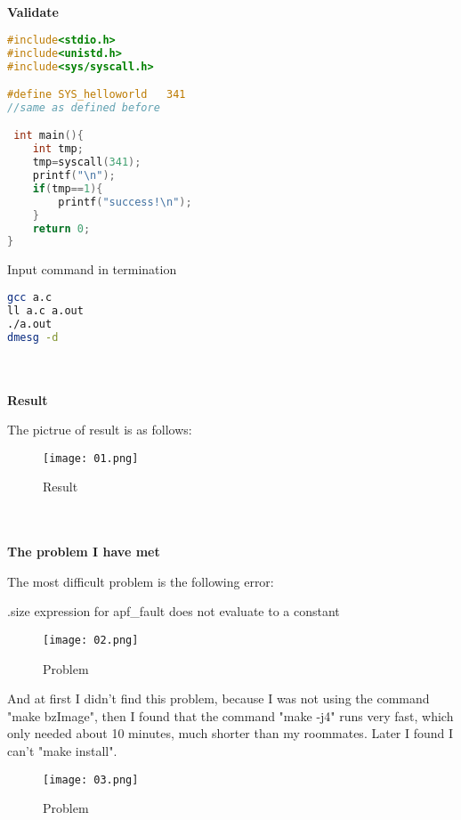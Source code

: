 \documentclass[12pt,a4paper]{article}
\begin{document}
\begin{large}
~\\
~\\
\textbf{Validate}
\end{large}

\begin{lstlisting}[language=C] 
#include<stdio.h>
#include<unistd.h>
#include<sys/syscall.h>

#define SYS_helloworld   341   
//same as defined before

 int main(){
	int tmp;
	tmp=syscall(341);
	printf("\n");
	if(tmp==1){
		printf("success!\n");
	}
	return 0;
}
\end{lstlisting}

\quad Input command in termination 

\begin{lstlisting}[language=bash] 
gcc a.c
ll a.c a.out
./a.out
dmesg -d
\end{lstlisting}
\begin{large}
~\\
~\\
\textbf{Result}
\end{large}

The pictrue of result is as follows:

\begin{figure}[H]
  \centering
  \texttt{[image: 01.png]}
  \caption{Result}%
\end{figure}

\begin{large}
~\\
~\\
\textbf{The problem I have met}
\end{large}

The most difficult problem is the following error: 

\quad\quad .size expression for apf\_fault does not evaluate to a constant

\begin{figure}[H]
  \centering
  \texttt{[image: 02.png]}
  \caption{Problem}%
\end{figure}

And at first I didn't find this problem, because I was not using the command "make bzImage", then I found that the command "make -j4" runs very fast, which only needed about 10 minutes, much shorter than my roommates. Later I found I can't "make install".

\begin{figure}[H]
  \centering
  \texttt{[image: 03.png]}
  \caption{Problem}%
\end{figure}
\end{document}
